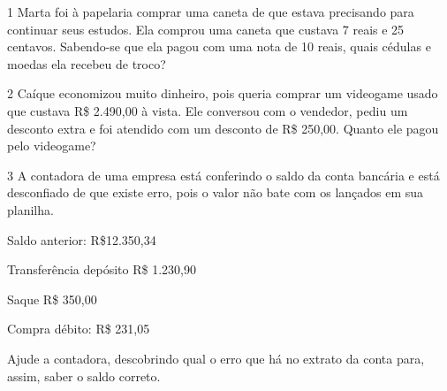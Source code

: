 {

\num{1} Marta foi à papelaria comprar uma caneta de que estava precisando para continuar seus estudos. Ela comprou uma caneta que custava 7 reais e 25
centavos. Sabendo-se que ela pagou com uma nota de 10 reais, quais
cédulas e moedas ela recebeu de troco?



\num{2} Caíque economizou muito dinheiro, pois queria comprar um videogame
usado que custava R\$ 2.490,00 à vista. Ele conversou com o vendedor, pediu um desconto extra e foi atendido com um desconto de R\$ 250,00.
Quanto ele pagou pelo videogame?



\num{3} A contadora de uma empresa está conferindo o saldo da conta
bancária e está desconfiado de que existe erro, pois o valor não bate com
os lançados em sua planilha.


Saldo anterior: R\$12.350,34

Transferência depósito R\$ 1.230,90

Saque R\$ 350,00

Compra débito: R\$ 231,05

Ajude a contadora, descobrindo qual o erro que há no extrato da conta para, assim, saber o saldo correto.



}
